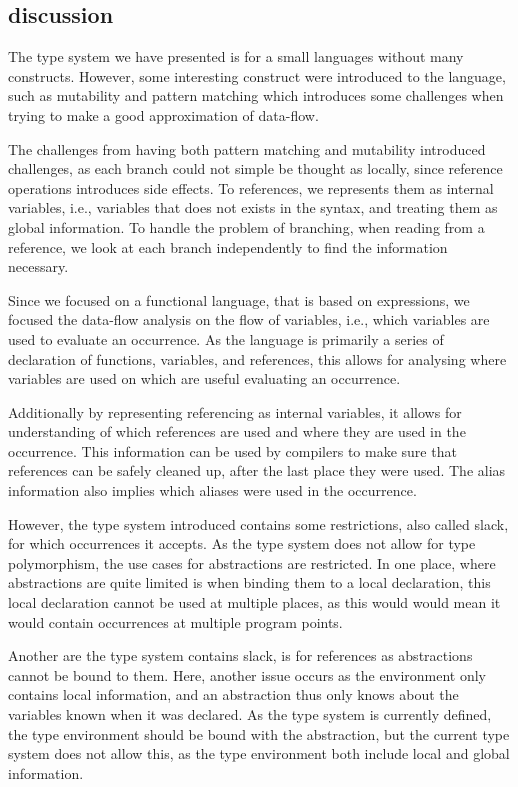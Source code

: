 \documentclass[../../master.tex]{subfiles}
\begin{document}
\subsection{discussion}
The type system we have presented is for a small languages without many constructs.
However, some interesting construct were introduced to the language, such as mutability and pattern matching which introduces some challenges when trying to make a good approximation of data-flow.

The challenges from having both pattern matching and mutability introduced challenges, as each branch could not simple be thought as locally, since reference operations introduces side effects.
To references, we represents them as internal variables, i.e., variables that does not exists in the syntax, and treating them as global information.
To handle the problem of branching, when reading from a reference, we look at each branch independently to find the information necessary.
\bigskip

Since we focused on a functional language, that is based on expressions, we focused the data-flow analysis on the flow of variables, i.e., which variables are used to evaluate an occurrence.
As the language is primarily a series of declaration of functions, variables, and references, this allows for analysing where variables are used on which are useful evaluating an occurrence.

Additionally by representing referencing as internal variables, it allows for understanding of which references are used and where they are used in the occurrence.
This information can be used by compilers to make sure that references can be safely cleaned up, after the last place they were used.
The alias information also implies which aliases were used in the occurrence.
\bigskip

However, the type system introduced contains some restrictions, also called slack, for which occurrences it accepts.
As the type system does not allow for type polymorphism, the use cases for abstractions are restricted.
In one place, where abstractions are quite limited is when binding them to a local declaration, this local declaration cannot be used at multiple places, as this would would mean it would contain occurrences at multiple program points.

Another are the type system contains slack, is for references as abstractions cannot be bound to them.
Here, another issue occurs as the environment only contains local information, and an abstraction thus only knows about the variables known when it was declared.
As the type system is currently defined, the type environment should be bound with the abstraction, but the current type system does not allow this, as the type environment both include local and global information.
\end{document}
